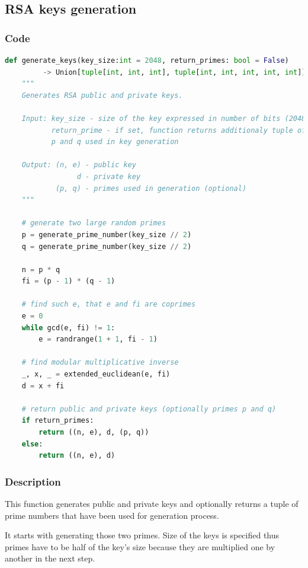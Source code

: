 \documentclass{article}
\begin{document}
\subsection{RSA keys generation}
\subsubsection{Code}

\small

\begin{lstlisting}[language=Python]
    def generate_keys(key_size:int = 2048, return_primes: bool = False)
         -> Union[tuple[int, int, int], tuple[int, int, int, int, int]]:
    """
    Generates RSA public and private keys.

    Input: key_size - size of the key expressed in number of bits (2048 bits by default)
           return_prime - if set, function returns additionaly tuple of prime numbers 
           p and q used in key generation

    Output: (n, e) - public key
                 d - private key
            (p, q) - primes used in generation (optional)
    """

    # generate two large random primes
    p = generate_prime_number(key_size // 2)
    q = generate_prime_number(key_size // 2)

    n = p * q
    fi = (p - 1) * (q - 1)

    # find such e, that e and fi are coprimes
    e = 0
    while gcd(e, fi) != 1:
        e = randrange(1 + 1, fi - 1)

    # find modular multiplicative inverse
    _, x, _ = extended_euclidean(e, fi)
    d = x + fi

    # return public and private keys (optionally primes p and q)
    if return_primes:
        return ((n, e), d, (p, q))
    else:
        return ((n, e), d)
\end{lstlisting}

\normalsize

\subsubsection{Description}
This function generates public and private keys and optionally returns a tuple of prime
numbers that have been used for generation process.

It starts with generating those two primes. Size of the keys is specified thus primes have
to be half of the key's size because they are multiplied one by another in the next step.
\end{document}
